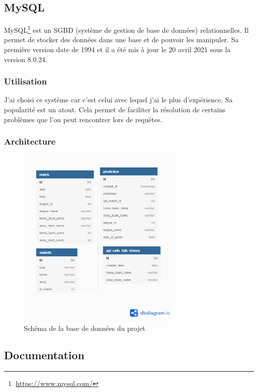 \documentclass[a4paper,14pt]{extarticle}
\begin{document}
{\subsection{MySQL}

MySQL\footnote{\url{https://www.mysql.com/}} est un SGBD (système de gestion de base de données) relationnelles. Il permet de stocker des données dans une base et de pouvoir les manipuler. Sa première version date de 1994 et il a été mis à jour le 20 avril 2021 sous la version 8.0.24. 

\subsubsection{Utilisation}
J'ai choisi ce système car c'est celui avec lequel j'ai le plus d'expérience. Sa popularité est un atout. Cela permet de faciliter la résolution de certains problèmes que l'on peut rencontrer lors de requêtes.

\subsubsection{Architecture}

\begin{figure}[htp]
    \centering
    \includegraphics[width=21.5em]{../img/schemaBDDv2.png}
    \caption{Schéma de la base de données du projet}
    \label{fig:schemaDB}
\end{figure}

\newpage

\subsection{Documentation}

}
\end{document}
